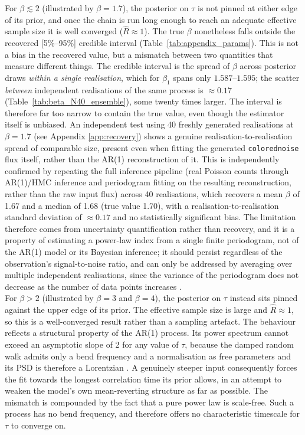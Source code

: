 \documentclass{aa}
\begin{document}
For $\beta \lesssim 2$ (illustrated by $\beta = 1.7$), the posterior on $\tau$ is not pinned at either edge of its prior, and once the chain is run long enough to reach an adequate effective sample size it is well converged ($\hat{R} \approx 1$). The true $\beta$ nonetheless falls outside the recovered [5\%--95\%] credible interval (Table~\ref{tab:appendix_params}). This is not a bias in the recovered value, but a mismatch between two quantities that measure different things. The credible interval is the spread of $\beta$ across posterior draws \emph{within a single realisation}, which for $\beta_1$ spans only $1.587$--$1.595$; the scatter \emph{between} independent realisations of the same process is $\approx 0.17$ (Table~\ref{tab:beta_N40_ensemble}), some twenty times larger. The interval is therefore far too narrow to contain the true value, even though the estimator itself is unbiased. An independent test using 40 freshly generated realisations at $\beta = 1.7$ (see Appendix \ref{app:recovery}) shows a genuine realisation-to-realisation spread of comparable size, present even when fitting the generated \texttt{colorednoise} flux itself, rather than the AR(1) reconstruction of it. This is independently confirmed by repeating the full inference pipeline (real Poisson counts through AR(1)/HMC inference and periodogram fitting on the resulting reconstruction, rather than the raw input flux) across 40 realisations, which recovers a mean $\beta$ of 1.67 and a median of 1.68 (true value 1.70), with a realisation-to-realisation standard deviation of $\approx 0.17$ and no statistically significant bias. The limitation therefore comes from uncertainty quantification rather than recovery, and it is a property of estimating a power-law index from a single finite periodogram, not of the AR(1) model or its Bayesian inference; it should persist regardless of the observation's signal-to-noise ratio, and can only be addressed by averaging over multiple independent realisations, since the variance of the periodogram does not decrease as the number of data points increases \citep[][and references therein]{Kankkunen2025}. \\
For $\beta > 2$ (illustrated by $\beta = 3$ and $\beta = 4$), the posterior on $\tau$ instead sits pinned against the upper edge of its prior. The effective sample size is large and $\hat{R} \approx 1$, so this is a well-converged result rather than a sampling artefact. The behaviour reflects a structural property of the AR(1) process. Its power spectrum cannot exceed an asymptotic slope of 2 for any value of $\tau$, because the damped random walk admits only a bend frequency and a normalisation as free parameters and its PSD is therefore a Lorentzian \citep{Kankkunen2025}. A genuinely steeper input consequently forces the fit towards the longest correlation time its prior allows, in an attempt to weaken the model's own mean-reverting structure as far as possible. The mismatch is compounded by the fact that a pure power law is scale-free. Such a process has no bend frequency, and therefore offers no characteristic timescale for $\tau$ to converge on. \\
\end{document}
